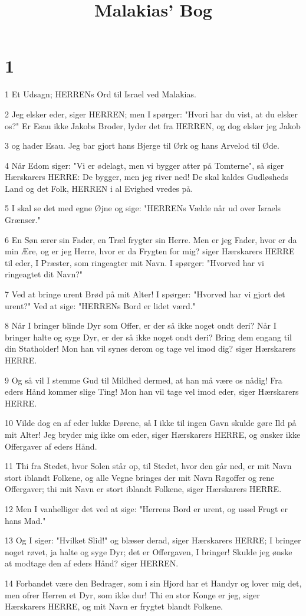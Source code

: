 

\title{Malakias' Bog}


\chapter{1}

\par 1 Et Udsagn; HERRENs Ord til Israel ved Malakias.
\par 2 Jeg elsker eder, siger HERREN; men I spørger: "Hvori har du vist, at du elsker os?" Er Esau ikke Jakobs Broder, lyder det fra HERREN, og dog elsker jeg Jakob
\par 3 og hader Esau. Jeg bar gjort hans Bjerge til Ørk og hans Arvelod til Øde.
\par 4 Når Edom siger: "Vi er ødelagt, men vi bygger atter på Tomterne", så siger Hærskarers HERRE: De bygger, men jeg river ned! De skal kaldes Gudløsheds Land og det Folk, HERREN i al Evighed vredes på.
\par 5 I skal se det med egne Øjne og sige: "HERRENs Vælde når ud over Israels Grænser."
\par 6 En Søn ærer sin Fader, en Træl frygter sin Herre. Men er jeg Fader, hvor er da min Ære, og er jeg Herre, hvor er da Frygten for mig? siger Hærskarers HERRE til eder, I Præster, som ringeagter mit Navn. I spørger: "Hvorved har vi ringeagtet dit Navn?"
\par 7 Ved at bringe urent Brød på mit Alter! I spørger: "Hvorved har vi gjort det urent?" Ved at sige: "HERRENs Bord er lidet værd."
\par 8 Når I bringer blinde Dyr som Offer, er der så ikke noget ondt deri? Når I bringer halte og syge Dyr, er der så ikke noget ondt deri? Bring dem engang til din Statholder! Mon han vil synes derom og tage vel imod dig? siger Hærskarers HERRE.
\par 9 Og så vil I stemme Gud til Mildhed dermed, at han må være os nådig! Fra eders Hånd kommer slige Ting! Mon han vil tage vel imod eder, siger Hærskarers HERRE.
\par 10 Vilde dog en af eder lukke Dørene, så I ikke til ingen Gavn skulde gøre Ild på mit Alter! Jeg bryder mig ikke om eder, siger Hærskarers HERRE, og ønsker ikke Offergaver af eders Hånd.
\par 11 Thi fra Stedet, hvor Solen står op, til Stedet, hvor den går ned, er mit Navn stort iblandt Folkene, og alle Vegne bringes der mit Navn Røgoffer og rene Offergaver; thi mit Navn er stort iblandt Folkene, siger Hærskarers HERRE.
\par 12 Men I vanhelliger det ved at sige: "Herrens Bord er urent, og ussel Frugt er hans Mad."
\par 13 Og I siger: "Hvilket Slid!" og blæser derad, siger Hærskarers HERRE; I bringer noget røvet, ja halte og syge Dyr; det er Offergaven, I bringer! Skulde jeg ønske at modtage den af eders Hånd? siger HERREN.
\par 14 Forbandet være den Bedrager, som i sin Hjord har et Handyr og lover mig det, men ofrer Herren et Dyr, som ikke dur! Thi en stor Konge er jeg, siger Hærskarers HERRE, og mit Navn er frygtet blandt Folkene.

